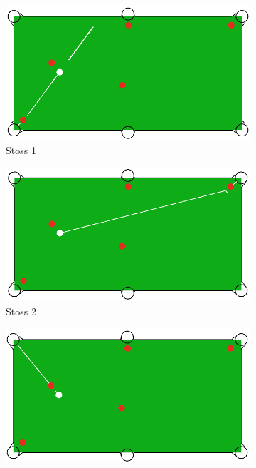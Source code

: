 \begin{figure}
    \centering
    \begin{subfigure}[b]{0.3\textwidth}
        \centering
        \includegraphics[width=1.0\linewidth]{../common/04_results/resources/simple_search/situation_diverse_solution_1.PNG}
        \caption{Stoss 1}
        \label{fig:situation_1_solution_1}
    \end{subfigure}
    \hfill
    \begin{subfigure}[b]{0.3\textwidth}
        \centering
        \includegraphics[width=1.0\linewidth]{../common/04_results/resources/simple_search/situation_diverse_solution_2.PNG}
        \caption{Stoss 2}
        \label{fig:situation_1_solution_2}
    \end{subfigure}
    \hfill
    \begin{subfigure}[b]{0.3\textwidth}
        \centering
        \includegraphics[width=1.0\linewidth]{../common/04_results/resources/simple_search/situation_diverse_solution_3.PNG}

\end{subfigure}
\end{figure}
